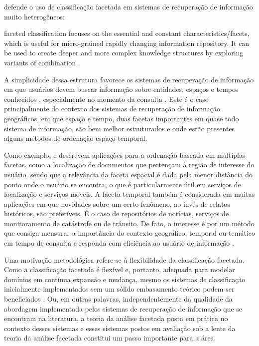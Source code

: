  defende o uso de classificação facetada em sistemas de recuperação de informação muito heterogêneos:

\begin{citacao}[english]
faceted classification focuses on the essential and constant characteristics/facets, which is useful for micro-grained rapidly changing information repository. It can be used to create deeper and more complex knowledge structures by exploring variants of combination \cite[p. 47]{hong06}.
\end{citacao} 

A simplicidade dessa estrutura favorece os sistemas de recuperação de informação em que usuários devem buscar informação sobre entidades, espaços e tempos conhecidos \cite{toda08,entityCentric12}, especialmente no momento da consulta \cite{andrade06}. Este é o caso principalmente do contexto dos sistemas de recuperação de informação geográficos, em que espaço e tempo, duas facetas importantes em quase todo sistema de informação, são bem melhor estruturados e onde estão presentes alguns métodos de ordenação espaço-temporal.

Como exemplo,  e  descrevem aplicações para a ordenação baseada em múltiplas facetas, como a localização de documentos que pertençam à região de interesse do usuário, sendo que a relevância da faceta espacial é dada pela menor distância do ponto onde o usuário se encontra, o que é particularmente útil em serviços de localização e serviços móveis. A faceta temporal também é considerada em muitas aplicações em que novidades sobre um certo fenômeno, ao invés de relatos históricos, são preferíveis. É o caso de repositórios de notícias, serviços de monitoramento de catástrofe ou de trânsito. De fato, o interesse é por um método que consiga mensurar a importância do contexto geográfico, temporal ou temático em tempo de consulta \cite{andrade06} e responda com eficiência ao usuário de informação \cite{yuCai07,GarciaCumbreras09}.

Uma motivação metodológica refere-se à flexibilidade da classificação facetada. Como a classificação facetada é flexível e, portanto, adequada para modelar domínios em contínua expansão e mudança, mesmo os sistemas de classificação inicialmente implementados sem um sólido embasamento teórico podem ser beneficiados \cite{hong06,labarre2010}. Ou, em outras palavras, independentemente da qualidade da abordagem implementada pelos sistemas de recuperação de informação que se encontram na literatura, a teoria da análise facetada posta em prática no contexto desses sistemas e esses sistemas postos em avaliação sob a lente da teoria da análise facetada constitui um passo importante para a área.







